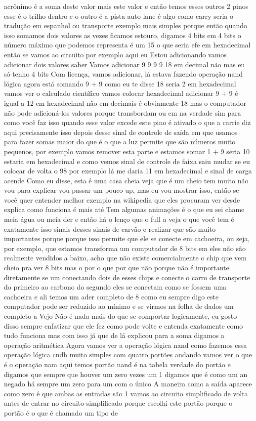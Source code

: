 \documentclass[oneside,11pt]{memoir} %
\begin{document}
acrônimo é a soma deste  valor mais este valor e então temos  esses outros 2 pinos esse é o trilho  dentro e o outro é a pista auto lane é  algo como carry seria o  tradução em espanhol ou transporte  exemplo mais simples porque então quando  isso somamos dois valores as vezes ficamos  estouro, digamos 4 bits em  4 bits o número máximo que podemos  representa é um 15  o que seria efe em hexadecimal então se  vamos ao circuito por exemplo aqui eu  Estou adicionando vamos adicionar dois valores  saber  Vamos adicionar 9 9 9 9 18 em decimal não  mas eu só tenho 4 bits  Com licença, vamos adicionar, lá estava  fazendo operação nand lógica agora  está somando  9 + 9 como eu te disse 18 seria 2 em  hexadecimal vamos ver o calculado  científico vamos colocar hexadecimal  adicionar 9 + 9  é igual a 12 em hexadecimal não em  decimais é obviamente 18  mas o computador não pode adicioná-los  valores porque transbordam ou em  na verdade sim para como você faz isso quando  esse valor excede este pino é ativado  o que a carrie diz aqui precisamente isso  depois desse sinal de controle de saída  em que usamos para fazer somas  maior do que é o que a luz permite  que são números muito pequenos, por exemplo  vamos remover esta parte e estamos  somar 1 + 9 seria 10 estaria em  hexadecimal e como vemos  sinal de controle de faixa saiu  mudar se eu colocar de volta o 98 por  exemplo lá me daria 11 em hexadecimal e  sinal de carga acende  Como eu disse, esta é uma casa cheia  veja que é um cheio tem muito não vou  para explicar vou passar um pouco  up, mas eu vou mostrar isso, então se  você quer entender melhor  exemplo na wikipedia que eles procuram ver desde  explica como funciona é mais até  Tem algumas animações é o que eu sei  chame meia água ou meia der e  então há o lenço que o full a  veja o que você tem é exatamente isso  sinais desses sinais de carvão e  realizar que são muito importantes porque  porque isso permite que ele se conecte em  cachoeira, ou seja, por exemplo, que estamos  transforma um computador de 8 bits em  eles não são realmente vendidos a baixo, acho que não  existe comercialmente o chip que  vem cheio pra ver 8 bits mas o por  o que por que não porque não é importante  diretamente se um conectando dois de  esses chips e conecte o carro de transporte  do primeiro ao carbono do segundo  eles se conectam como se fossem uma cachoeira e ali  temos um ader completo de 8  como eu sempre digo este computador  pode ser reduzido ao mínimo e  se virmos na folha de dados um completo a  Vejo  Não é nada mais do que se comportar logicamente, eu gosto disso  sempre enfatizar que ele fez como pode  volte e entenda exatamente  como tudo funciona  mas com isso já que de lá explicou para  a soma digamos a operação aritmética  Agora vamos ver a operação lógica  nand como fazemos essa operação  lógica cndh muito simples com quatro  portões andando vamos ver o que é o  operação nam aqui temos portão nand é  na tabela verdade do portão  e digamos que sempre que houver um  zero vezes um 1 digamos que é como um an  negado  há sempre um zero para um com o único  A maneira como a saída aparece como zero é  que ambas as entradas são 1  vamos ao circuito simplificado de volta  antes de entrar no circuito  simplificado porque escolhi este portão  porque o portão é o que é  chamado um tipo de 
\end{document}
